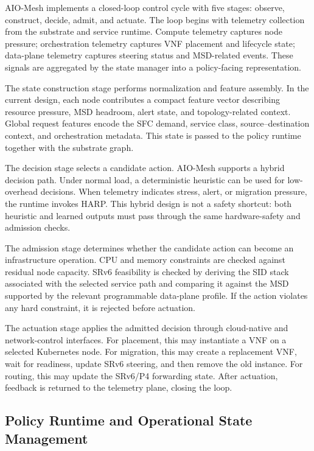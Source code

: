 \documentclass[final,5p]{elsarticle}
\begin{document}
AIO-Mesh implements a closed-loop control cycle with five stages: observe, construct, decide, admit, and actuate. The loop begins with telemetry collection from the substrate and service runtime. Compute telemetry captures node pressure; orchestration telemetry captures VNF placement and lifecycle state; data-plane telemetry captures steering status and MSD-related events. These signals are aggregated by the state manager into a policy-facing representation.

The state construction stage performs normalization and feature assembly. In the current design, each node contributes a compact feature vector describing resource pressure, MSD headroom, alert state, and topology-related context. Global request features encode the SFC demand, service class, source--destination context, and orchestration metadata. This state is passed to the policy runtime together with the substrate graph.

The decision stage selects a candidate action. AIO-Mesh supports a hybrid decision path. Under normal load, a deterministic heuristic can be used for low-overhead decisions. When telemetry indicates stress, alert, or migration pressure, the runtime invokes HARP. This hybrid design is not a safety shortcut: both heuristic and learned outputs must pass through the same hardware-safety and admission checks.

The admission stage determines whether the candidate action can become an infrastructure operation. CPU and memory constraints are checked against residual node capacity. SRv6 feasibility is checked by deriving the SID stack associated with the selected service path and comparing it against the MSD supported by the relevant programmable data-plane profile. If the action violates any hard constraint, it is rejected before actuation.

The actuation stage applies the admitted decision through cloud-native and network-control interfaces. For placement, this may instantiate a VNF on a selected Kubernetes node. For migration, this may create a replacement VNF, wait for readiness, update SRv6 steering, and then remove the old instance. For routing, this may update the SRv6/P4 forwarding state. After actuation, feedback is returned to the telemetry plane, closing the loop.

\subsection{Policy Runtime and Operational State Management}
\label{subsec:policy_runtime}
\end{document}

